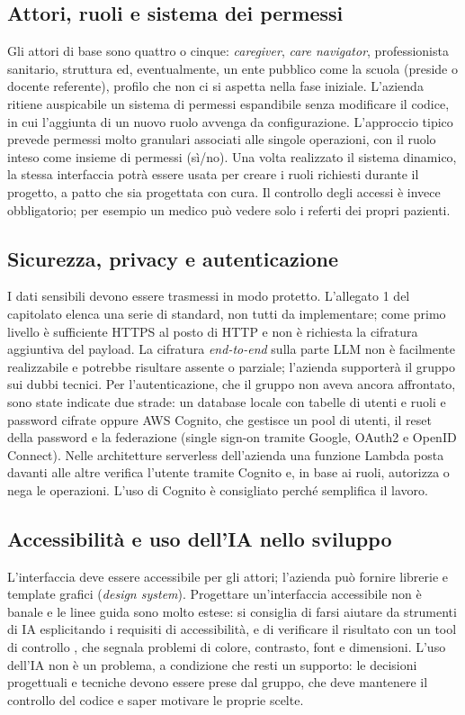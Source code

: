 \documentclass[11pt, a4paper]{article}
\begin{document}
\subsection{Attori, ruoli e sistema dei permessi}
Gli attori di base sono quattro o cinque: \emph{caregiver}, \emph{care navigator}, professionista sanitario, struttura ed, eventualmente, un ente pubblico come la scuola (preside o docente referente), profilo che non ci si aspetta nella fase iniziale. L'azienda ritiene auspicabile un sistema di permessi espandibile senza modificare il codice, in cui l'aggiunta di un nuovo ruolo avvenga da configurazione. L'approccio tipico prevede permessi molto granulari associati alle singole operazioni, con il ruolo inteso come insieme di permessi (sì/no). Una volta realizzato il sistema dinamico, la stessa interfaccia potrà essere usata per creare i ruoli richiesti durante il progetto, a patto che sia progettata con cura. Il controllo degli accessi è invece obbligatorio; per esempio un medico può vedere solo i referti dei propri pazienti.

\subsection{Sicurezza, privacy e autenticazione}
I dati sensibili devono essere trasmessi in modo protetto. L'allegato 1 del capitolato elenca una serie di standard, non tutti da implementare; come primo livello è sufficiente HTTPS al posto di HTTP e non è richiesta la cifratura aggiuntiva del payload. La cifratura \emph{end-to-end} sulla parte LLM non è facilmente realizzabile e potrebbe risultare assente o parziale; l'azienda supporterà il gruppo sui dubbi tecnici. Per l'autenticazione, che il gruppo non aveva ancora affrontato, sono state indicate due strade: un database locale con tabelle di utenti e ruoli e password cifrate oppure AWS Cognito, che gestisce un pool di utenti, il reset della password e la federazione (single sign-on tramite Google, OAuth2 e OpenID Connect). Nelle architetture serverless dell'azienda una funzione Lambda posta davanti alle altre verifica l'utente tramite Cognito e, in base ai ruoli, autorizza o nega le operazioni. L'uso di Cognito è consigliato perché semplifica il lavoro.

\subsection{Accessibilità e uso dell'IA nello sviluppo}
L'interfaccia deve essere accessibile per gli attori; l'azienda può fornire librerie e template grafici (\emph{design system}). Progettare un'interfaccia accessibile non è banale e le linee guida sono molto estese: si consiglia di farsi aiutare da strumenti di IA esplicitando i requisiti di accessibilità, e di verificare il risultato con un tool di controllo , che segnala problemi di colore, contrasto, font e dimensioni. L'uso dell'IA non è un problema, a condizione che resti un supporto: le decisioni progettuali e tecniche devono essere prese dal gruppo, che deve mantenere il controllo del codice e saper motivare le proprie scelte.
\end{document}
